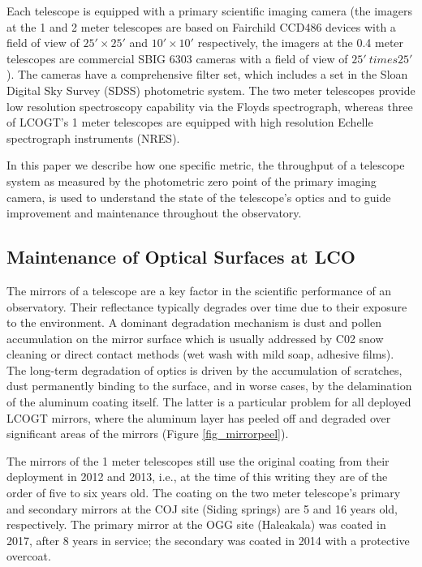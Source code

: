 \documentclass[draft]{spieman}
\begin{document}
Each telescope is equipped with a primary scientific imaging camera (the imagers at the 1 and 2
meter telescopes are based on Fairchild CCD486 devices with a field of view of $25' \times 25'$ and
$10' \times 10'$ respectively, the imagers at the 0.4 meter telescopes are commercial SBIG 6303
cameras with a field of view of $25' \ times 25'$). The cameras have a comprehensive filter set,
which includes a set in the Sloan Digital Sky Survey (SDSS) photometric system\cite{fukugita1996}. The two meter telescopes
provide low resolution spectroscopy capability via the Floyds\cite{brown2013} spectrograph, whereas
three of LCOGT's 1 meter telescopes are equipped with high resolution Echelle spectrograph instruments
(NRES)\cite{eastman2014,siverd2016}.

In this paper we describe how one specific metric, the throughput of a telescope system as measured
by the photometric zero point of the primary imaging camera, is used to understand the state of the
telescope's optics and to guide improvement and maintenance throughout the observatory.


\subsection{Maintenance of Optical Surfaces at LCO}


The mirrors of a telescope are a key factor in the  scientific performance of an observatory.
Their reflectance typically degrades over time due to their exposure to the environment. A dominant
degradation mechanism is dust and pollen accumulation on the mirror surface which is usually
addressed by C02 snow cleaning or direct contact methods (wet wash with mild soap, adhesive films).
The long-term degradation of optics is driven by the accumulation of scratches, dust permanently
binding to the surface, and in worse cases, by the delamination of the aluminum coating itself. The
latter is a particular problem for all deployed LCOGT mirrors, where the aluminum layer has
peeled off and degraded over significant areas of the mirrors (Figure \ref{fig_mirrorpeel}). 

The mirrors of the 1 meter telescopes still use the original coating from their deployment in 2012 
and 2013, i.e., at the time of this writing they are of the order of five to six years old. The
coating  on the two meter telescope's  primary and secondary mirrors at the COJ site (Siding
springs) are 5  and 16 years old, respectively. The primary  mirror at the OGG site (Haleakala) was
coated in 2017, after 8 years in service; the secondary  was coated in 2014 with a protective 
overcoat.   
\end{document}
